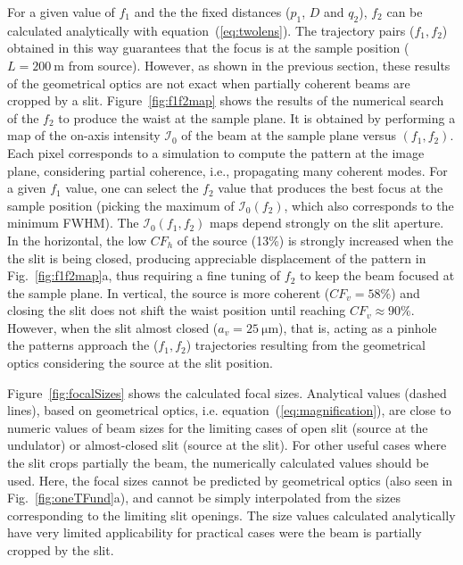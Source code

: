 \documentclass[doublecol]{epl2}
\begin{document}
For a given value of $f_1$ and the the fixed distances ($p_1$, $D$ and $q_2$), $f_2$ can be calculated analytically with equation~(\ref{eq:twolens}). The trajectory pairs ($f_1,f_2$) obtained in this way guarantees that the focus is at the sample position ($L=\SI{200}{\meter}$ from source). However, as shown in the previous section, these results of the geometrical optics are not exact when partially coherent beams are cropped by a slit. 
Figure~\ref{fig:f1f2map} shows the results of the numerical search of the $f_2$ to produce the waist at the sample plane. It is obtained by performing a map of the on-axis intensity $\mathcal{I}_0$ of the beam at the sample plane versus $(f_1,f_2)$. Each pixel corresponds to a simulation to compute the pattern at the image plane, considering partial coherence, i.e., propagating many coherent modes. For a given $f_1$ value, one can select the $f_2$ value that produces the best focus at the sample position (picking the maximum of $\mathcal{I}_0(f_2)$, which also corresponds to the minimum FWHM). 
The $\mathcal{I}_0(f_1,f_2)$ maps depend strongly on the slit aperture. In the horizontal, the low $CF_h$ of the source (13\%) is strongly increased when the the slit is being closed, producing appreciable displacement of the pattern in Fig.~\ref{fig:f1f2map}a, thus requiring a fine tuning of $f_2$ to keep the beam focused at the sample plane. In vertical, the source is more coherent ($CF_v=58\%$) and closing the slit does not 
shift the waist position until reaching $CF_v\approx90\%$. However, when the slit almost closed ($a_v=\SI{25}{\micro\meter}$), that is, acting as a pinhole the patterns approach the ($f_1,f_2$) trajectories resulting from the geometrical optics considering the source at the slit position.

Figure~\ref{fig:focalSizes} shows the calculated focal sizes. Analytical values (dashed lines), based on geometrical optics, i.e. equation~(\ref{eq:magnification}), are close to numeric values of beam sizes for the limiting cases of open slit (source at the undulator) or almost-closed slit (source at the slit). For other useful cases where the slit crops partially the beam, the numerically calculated values should be used. Here, the focal sizes cannot be predicted by geometrical optics (also seen in Fig.~\ref{fig:oneTFund}a), and cannot be simply interpolated from the sizes corresponding to the limiting slit openings. The size values calculated analytically have very limited applicability for practical cases were the beam is partially cropped by the slit. 
\end{document}
